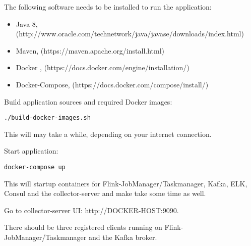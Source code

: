 The following software needs to be installed to run the application:

\begin{itemize}
    \item Java 8, (http://www.oracle.com/technetwork/java/javase/downloads/index.html)
    \item Maven, (https://maven.apache.org/install.html)
    \item Docker , (https://docs.docker.com/engine/installation/)
    \item Docker-Compose, (https://docs.docker.com/compose/install/)
\end{itemize}

Build application sources and required Docker images:

\verb|./build-docker-images.sh|

This will  may take a while, depending on your internet connection.

Start application:

\verb|docker-compose up|

This will startup containers for Flink-JobManager/Taskmanager, Kafka, ELK, Consul and the collector-server and make take some time as well.

Go to collector-server UI: http://{DOCKER-HOST}:9090.

There should be three registered clients running on Flink-JobManager/Taskmanager and the Kafka broker.